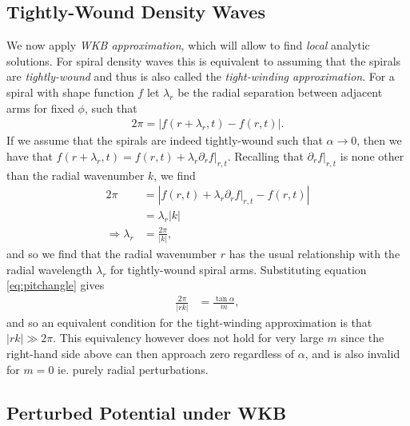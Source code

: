 \subsection{Tightly-Wound Density Waves}

We now apply \textit{WKB approximation}, which will allow to find \textit{local} analytic solutions.
For spiral density waves this is equivalent to assuming that the spirals are \textit{tightly-wound} and thus is also called the \textit{tight-winding approximation}.
For a spiral with shape function $f$ let $\lambda_r$ be the radial separation between adjacent arms for fixed $\phi$, such that
\begin{align}
    2\pi = \left| f(r+\lambda_r, t) - f(r,t) \right|.
\end{align}
If we assume that the spirals are indeed tightly-wound such that $\alpha\rightarrow 0$, then we have that $f(r+\lambda_r,t)=f(r,t) + \lambda_r \partial_r f |_{r,t}$. 
Recalling that $\partial_r f |_{r,t}$ is none other than the radial wavenumber $k$, we find
\begin{align}
    2 \pi &= \left| f(r,t) + \lambda_r \partial_r f |_{r,t} - f(r,t) \right| \\
    &= \lambda_r | k | \\
    \Rightarrow \lambda_r &= \frac{2 \pi}{|k|},
\end{align}
and so we find that the radial wavenumber $r$ has the usual relationship with the radial wavelength $\lambda_r$ for tightly-wound spiral arms. 
Substituting equation \ref{eq:pitchangle} gives
\begin{align}
    \frac{2 \pi}{|rk|} &=  \frac{\tan \alpha}{m},
\end{align}
and so an equivalent condition for the tight-winding approximation is that $|rk| \gg 2 \pi$. 
This equivalency however does not hold for very large $m$ since the right-hand side above can then approach zero regardless of $\alpha$, and is also invalid for $m = 0$ ie. purely radial perturbations.

\subsection{Perturbed Potential under WKB}

